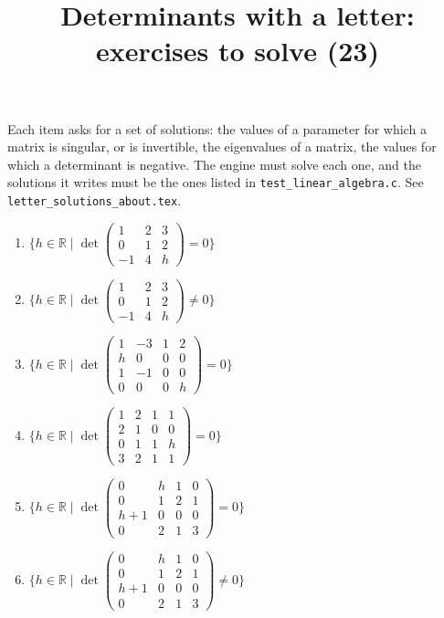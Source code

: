 \documentclass[11pt,a4paper]{article}
\title{Determinants with a letter: exercises to solve (23)}
\author{}
\date{}
\begin{document}
\maketitle
Each item asks for a set of solutions: the values of a parameter for which a matrix is singular, or is invertible, the eigenvalues of a matrix, the values for which a determinant is negative. The engine must solve each one, and the solutions it writes must be the ones listed in \texttt{test\_linear\_algebra.c}. See \texttt{letter\_solutions\_about.tex}.

\begin{enumerate}
\item $\displaystyle \{h \in \mathbb{R} \mid \det \begin{pmatrix} 1 & 2 & 3 \\ 0 & 1 & 2 \\ -1 & 4 & h \end{pmatrix} = 0\}$
\item $\displaystyle \{h \in \mathbb{R} \mid \det \begin{pmatrix} 1 & 2 & 3 \\ 0 & 1 & 2 \\ -1 & 4 & h \end{pmatrix} \neq 0\}$
\item $\displaystyle \{h \in \mathbb{R} \mid \det \begin{pmatrix} 1 & -3 & 1 & 2 \\ h & 0 & 0 & 0 \\ 1 & -1 & 0 & 0 \\ 0 & 0 & 0 & h \end{pmatrix} = 0\}$
\item $\displaystyle \{h \in \mathbb{R} \mid \det \begin{pmatrix} 1 & 2 & 1 & 1 \\ 2 & 1 & 0 & 0 \\ 0 & 1 & 1 & h \\ 3 & 2 & 1 & 1 \end{pmatrix} = 0\}$
\item $\displaystyle \{h \in \mathbb{R} \mid \det \begin{pmatrix} 0 & h & 1 & 0 \\ 0 & 1 & 2 & 1 \\ h + 1 & 0 & 0 & 0 \\ 0 & 2 & 1 & 3 \end{pmatrix} = 0\}$
\item $\displaystyle \{h \in \mathbb{R} \mid \det \begin{pmatrix} 0 & h & 1 & 0 \\ 0 & 1 & 2 & 1 \\ h + 1 & 0 & 0 & 0 \\ 0 & 2 & 1 & 3 \end{pmatrix} \neq 0\}$

\end{enumerate}
\end{document}
